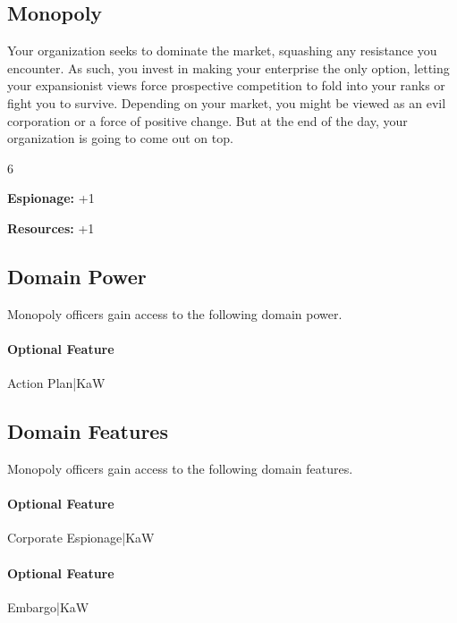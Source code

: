 \documentclass[10pt,a4paper,twoside,bg=print,twocolumn,openany,nodeprecatedcode]{dndbook}
\begin{document}
\subsection{Monopoly}
Your organization seeks to dominate the market, squashing any resistance you encounter. As such, you invest in making your enterprise the only option, letting your expansionist views force prospective competition to fold into your ranks or fight you to survive. Depending on your market, you might be viewed as an evil corporation or a force of positive change. But at the end of the day, your organization is going to come out on top.

{\par \vspace { 9pt plus 3pt minus 3pt } \noindent  {} \nopagebreak }

\begin{itemize}
\begin{multicols}{6}
\item \textbf{Espionage:} +1
\item \textbf{Resources:} +1
\end{multicols}

\end{itemize}

\subsection{Domain Power}
Monopoly officers gain access to the following domain power.

\paragraph{Optional Feature}
Action Plan|KaW

\subsection{Domain Features}
Monopoly officers gain access to the following domain features.

\paragraph{Optional Feature}
Corporate Espionage|KaW

\paragraph{Optional Feature}
Embargo|KaW
\end{document}
